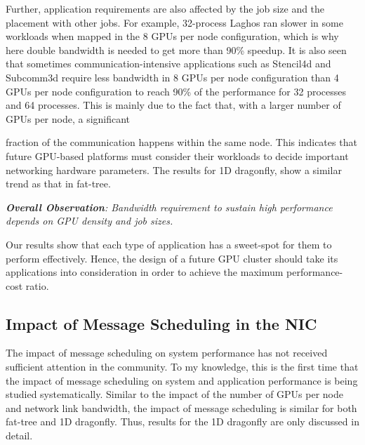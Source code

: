 Further, application requirements are also affected by the job size and the
placement with other jobs.  For example, 32-process Laghos ran slower in some
workloads when mapped in the 8 GPUs per node configuration, which is why here
double bandwidth is needed to get more than 90\% speedup. It is also seen that sometimes
communication-intensive applications such as Stencil4d and Subcomm3d require
less bandwidth in 8 GPUs per node configuration than 4 GPUs per node
configuration to reach 90\% of the performance for 32 processes and 64 processes.  This
is mainly due to the fact that, with a larger number of GPUs per node, a significant

fraction of the communication happens within the same node.  This indicates that
future GPU-based platforms must consider their workloads to decide important
networking hardware parameters.  The results for 1D
dragonfly, show a similar trend as that in fat-tree. 


\vspace{1em}
\noindent
{\it \textbf{Overall Observation}:
Bandwidth requirement to sustain high performance depends on GPU density
and job sizes.}

\noindent
Our results show that
  each type of application has a sweet-spot for them to perform effectively. 
  Hence, the design of a future GPU cluster should take its applications into
  consideration in order to achieve the maximum performance-cost ratio. 




\subsection{Impact of Message Scheduling in the NIC}

The impact of message scheduling on system performance has not received
sufficient attention in the community. To my knowledge, this is the first time
that the impact of message scheduling on system and application performance
is being studied systematically.
Similar to the impact of the number of GPUs per node and network link bandwidth, the impact
of message scheduling is similar for both fat-tree and 1D dragonfly. Thus,
results for the 1D dragonfly are only discussed in detail. 

